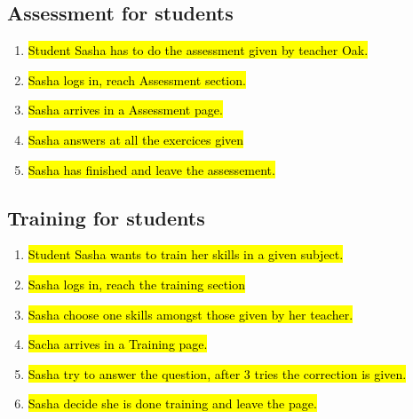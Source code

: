 \documentclass{article}
\begin{document}
    \subsection{Assessment for students}

        \begin{enumerate}

            \item \hl{Student Sasha has to do the assessment given by teacher Oak.}
            \item \hl{Sasha logs in, reach Assessment section.}
            \item \hl{Sasha arrives in a Assessment page.}
            \item \hl{Sasha answers at all the exercices given}
            \item \hl{Sasha has finished and leave the assessement.}


        \end{enumerate}

     \subsection{Training for students}
        \begin{enumerate}
            \item \hl{Student Sasha wants to train her skills in a given subject.}

            \item \hl{Sasha logs in, reach the training section}

            \item \hl{Sasha choose one skills amongst those given by her teacher.}

            \item \hl{Sacha arrives in a Training page.}

            \item \hl{Sasha try to answer the question, after 3 tries the correction is given.}

            \item \hl{Sasha decide she is done training and leave the page.}
        \end{enumerate}
\end{document}
